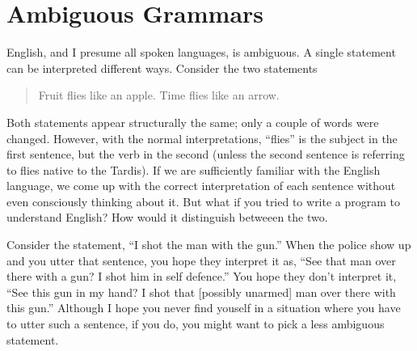 \documentclass[letterpaper,12pt,openany,reqno]{book}%
\begin{document}
\section{Ambiguous Grammars}\label{S.ambiguous.grammars}
English, and I presume all spoken languages, is ambiguous. A single statement can be interpreted different ways. Consider the two statements
\begin{quote}
Fruit flies like an apple.
Time flies like an arrow.
\end{quote}
Both statements appear structurally the same; only a couple of words were changed. However, with the normal interpretations, ``flies'' is the subject in the first sentence, but the verb in the second (unless the second sentence is referring to flies native to the Tardis). If we are sufficiently familiar with the English language, we come up with the correct interpretation of each sentence without even consciously thinking about it. But what if you tried to write a program to understand English? How would it distinguish betweeen the two.

Consider the statement, ``I shot the man with the gun.'' When the police show up and you utter that sentence, you hope they interpret it as, ``See that man over there with a gun? I shot him in self defence.'' You hope they don't interpret it, ``See this gun in my hand? I shot that [possibly unarmed] man over there with this gun.'' Although I hope you never find youself in a situation where you have to utter such a sentence, if you do, you might want to pick a less ambiguous statement.
\end{document}
